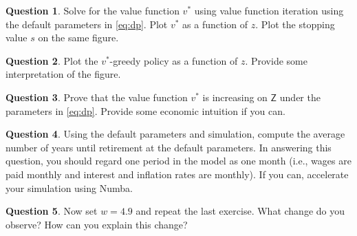 \documentclass[12pt]{article}
\newcommand{\1}{\mathbbm 1}
\newcommand{\Zsf}{\mathsf Z}
\theoremstyle{definition}
\newtheorem{question}{Question}
\begin{document}
\begin{question}
    Solve for the value function $v^*$ using value function iteration using
    the default parameters in \eqref{eq:dp}.  Plot $v^*$ as
    a function of $z$. Plot the stopping value $s$ on the same figure.    
\end{question}

\begin{question}
    Plot the $v^*$-greedy policy as a function of $z$.
    Provide some interpretation of the figure.  
\end{question}

\begin{question}
    Prove that the value function $v^*$ is increasing on $\Zsf$ under the
    parameters in \eqref{eq:dp}.  Provide some economic intuition if you can.
\end{question}

\begin{question}
    Using the default parameters and simulation, compute the average number of
    years until retirement at the default parameters.  In answering this
    question, you should regard one period in the model as one month (i.e.,
    wages are paid monthly and interest and inflation rates are monthly).
    If you can, accelerate your simulation using Numba.
\end{question}

\begin{question}
    Now set $w=4.9$ and repeat the last exercise.  What change do you observe?
    How can you explain this change?
\end{question}
\end{document}
